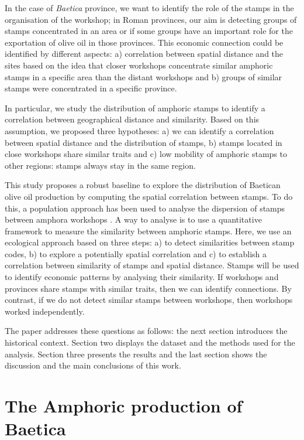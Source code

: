 \documentclass[review]{elsarticle}
\begin{document}
In the case of \textit{Baetica} province, we want to identify the role of the stamps in the organisation of the workshop; in Roman provinces, our aim is detecting groups of stamps concentrated in an area or if some groups have an important role for the exportation of olive oil in those provinces. This economic connection could be identified by different aspects: a) correlation between spatial distance and the sites based on the idea that closer workshops concentrate similar amphoric stamps in a specific area than the distant workshops and b) groups of similar stamps were concentrated in a specific province. 

In particular, we study the distribution of amphoric stamps to identify a correlation between geographical distance and similarity. Based on this assumption, we proposed three hypotheses: a) we can identify a correlation between spatial distance and the distribution of stamps, b) stamps located in close workshops share similar traits and c) low mobility of amphoric stamps to other regions: stamps always stay in the same region. 


This study proposes a robust baseline to explore the distribution of Baetican olive oil production by computing the spatial correlation between stamps. To do this, a population approach has been used to analyse the dispersion of stamps between amphora workshops \citep{rubio-campillo_ecology_2018}.  A way to analyse is to use a quantitative framework to measure the similarity between amphoric stamps. Here, we use an ecological approach based on three steps: a) to detect similarities between stamp codes, b) to explore a potentially spatial correlation and c) to establish a correlation between similarity of stamps and spatial distance. Stamps will be used to identify economic patterns by analysing their similarity. If workshops and provinces share stamps with similar traits, then we can identify connections. By contrast, if we do not detect similar stamps between workshops, then workshops worked independently. 

The paper addresses these questions as follows: the next section introduces the historical context. Section two displays the dataset and the methods used for the analysis. Section three presents the results and the last section shows the discussion and the main conclusions of this work. 


\section{The Amphoric production of Baetica}
\end{document}

